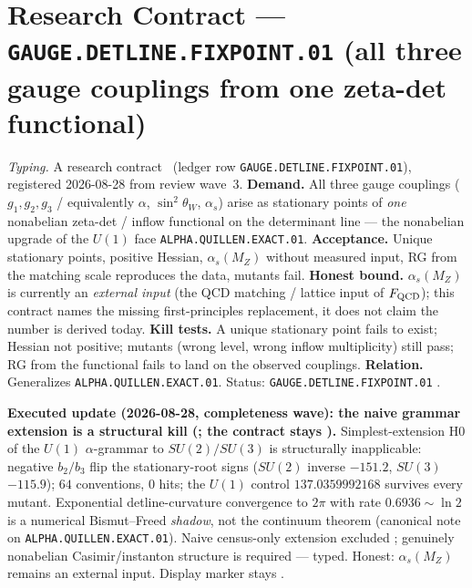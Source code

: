 \documentclass[11pt,a4paper]{article}
\begin{document}
\section*{Research Contract --- \texttt{GAUGE.DETLINE.FIXPOINT.01} (all three gauge couplings from one zeta-det functional)}
\noindent\emph{Typing.} A research contract \mO\ (ledger row \texttt{GAUGE.DETLINE.FIXPOINT.01}),
registered 2026-08-28 from review wave~3.  \textbf{Demand.}  All three gauge
couplings ($g_1,g_2,g_3$ / equivalently $\alpha$, $\sin^2\theta_W$, $\alpha_s$) arise as
stationary points of \emph{one} nonabelian zeta-det / inflow functional on the determinant line ---
the nonabelian upgrade of the $U(1)$ face \texttt{ALPHA.QUILLEN.EXACT.01}.  \textbf{Acceptance.}
Unique stationary points, positive Hessian, $\alpha_s(M_Z)$ without measured input, RG from the
matching scale reproduces the data, mutants fail.  \textbf{Honest bound.}  $\alpha_s(M_Z)$ is
currently an \emph{external input} (the QCD matching / lattice input of $F_{\rm QCD}$); this
contract names the missing first-principles replacement, it does not claim the number is derived
today.  \textbf{Kill tests.}  A unique stationary point fails to exist; Hessian not positive;
mutants (wrong level, wrong inflow multiplicity) still pass; RG from the functional fails to land
on the observed couplings.  \textbf{Relation.}  Generalizes \texttt{ALPHA.QUILLEN.EXACT.01}.
Status: \texttt{GAUGE.DETLINE.FIXPOINT.01} \mO.

\par\smallskip\noindent\textbf{Executed update (2026-08-28, completeness wave): the naive grammar
extension is a structural kill
(; the contract stays \mO).}
Simplest-extension H0 of the $U(1)$ $\alpha$-grammar to $SU(2)/SU(3)$ is structurally inapplicable:
negative $b_2/b_3$ flip the stationary-root signs ($SU(2)$ inverse $-151.2$, $SU(3)$ $-115.9$);
$64$ conventions, $0$ hits; the $U(1)$ control $137.0359992168$ survives every mutant.
Exponential detline-curvature convergence to $2\pi$ with rate $0.6936\sim\ln 2$ is a numerical
Bismut--Freed \emph{shadow}, not the continuum theorem (canonical note on
\texttt{ALPHA.QUILLEN.EXACT.01}).  Naive census-only extension excluded \mE; genuinely nonabelian
Casimir/instanton structure is required --- typed.  Honest: $\alpha_s(M_Z)$ remains an external
input.  Display marker stays \mO.
\end{document}
